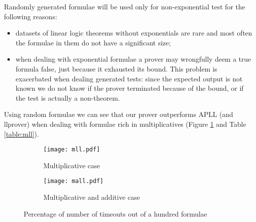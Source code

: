 Randomly generated formulae will be used only for non-exponential test for the following reasons:
\begin{itemize}
	\item datasets of linear logic theorems without exponentials are rare and most often the formulae in them do not have a significant size; 
	\item when dealing with exponential formulae a prover may wrongfully deem a true formula false, just because it exhausted its bound.
		This problem is exacerbated when dealing generated tests: since the expected output is not known we do not know if the prover terminated because of the bound, or if the test is actually a non-theorem.
\end{itemize}

Using random formulae we can see that our prover outperforms APLL (and llprover) when dealing with formulae rich in multiplicatives (Figure \ref{fig:mll bars} and Table \ref{table:mll}).
\begin{figure}[H]
	\centering
	\begin{subfigure}{0.49\textwidth}
		\centering
		\texttt{[image: mll.pdf]}
		\caption{Multiplicative case}
		\label{fig:mll bars}
	\end{subfigure}
	\begin{subfigure}{0.49\textwidth}
		\centering
		\texttt{[image: mall.pdf]}
		\caption{Multiplicative and additive case}
		\label{fig:mall bars}
	\end{subfigure}
	\caption{Percentage of number of timeouts out of a hundred formulae}
\end{figure}
